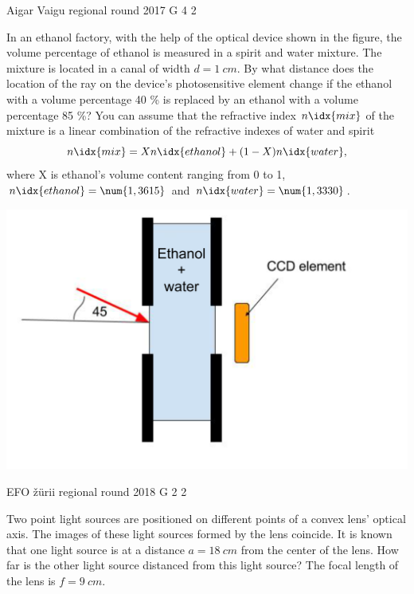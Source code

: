 \documentclass[11pt]{article}
\begin{document}
{Aigar Vaigu} %
{regional round} %
{2017} %
{G 4} %
{2} %
{

\ifEngStatement
In an ethanol factory, with the help of the optical device shown in the figure, the volume percentage of ethanol is measured in a spirit and water mixture. The mixture is located in a canal of width $d=\SI{1}{cm}$. By what distance does the location of the ray on the device's photosensitive element change if the ethanol with a volume percentage 40 \% is replaced by an ethanol with a volume percentage 85 \%? You can assume that the refractive index $n\idx{mix}$ of the mixture is a linear combination of the refractive indexes of water and spirit
$$
n\idx{mix}=Xn\idx{ethanol}+(1-X)n\idx{water},
$$
where X is ethanol’s volume content ranging from 0 to 1, $n\idx{ethanol}=\num{1,3615}$ and $n\idx{water}=\num{1,3330}$.
\begin{center}
	\vspace{-0pt}
	\includegraphics[width=0.5\linewidth]{2017-v2g-04-Piiritusetehas_ing}
	\vspace{-10pt}
\end{center}
\fi
}

{EFO žürii} %
{regional round} %
{2018} %
{G 2} %
{2} %
{

\ifEngStatement
Two point light sources are positioned on different points of a convex lens’ optical axis. The images of these light sources formed by the lens coincide. It is known that one light source is at a distance $a=\SI{18}{cm}$ from the center of the lens. How far is the other light source distanced from this light source? The focal length of the lens is $f=\SI{9}{cm}$.
\fi
}
\end{document}
